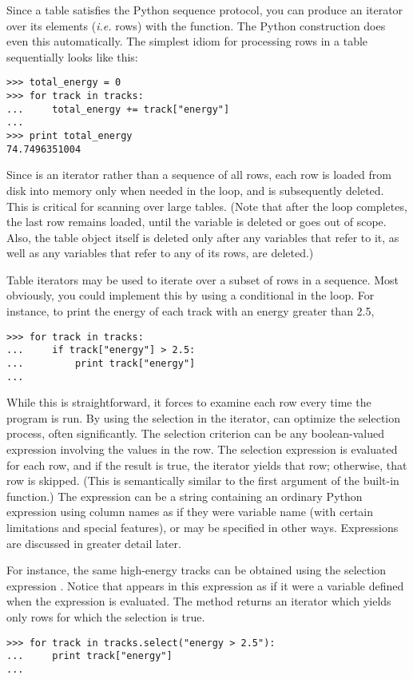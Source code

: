 Since a table satisfies the Python sequence protocol, you can produce an
iterator over its elements (\textit{i.e.} rows) with the 
function.  The Python  construction does even this
automatically.  The simplest idiom for processing rows in a table
sequentially looks like this:
\begin{verbatim}
>>> total_energy = 0
>>> for track in tracks:
...     total_energy += track["energy"]
...
>>> print total_energy
74.7496351004
\end{verbatim}

Since  is an iterator rather than a sequence of all
rows, each row is loaded from disk into memory only when needed in the
loop, and is subsequently deleted.  This is critical for scanning over
large tables.  (Note that after the loop completes, the last row remains
loaded, until the variable  is deleted or goes out of scope.
Also, the table object itself is deleted only after any variables that
refer to it, as well as any variables that refer to any of its rows, are
deleted.)

Table iterators may be used to iterate over a subset of rows in a
sequence.  Most obviously, you could implement this by using a
conditional in the loop.  For instance, to print the energy of each
track with an energy greater than 2.5,
\begin{verbatim}
>>> for track in tracks:
...     if track["energy"] > 2.5:
...         print track["energy"]
... 
\end{verbatim}
While this is straightforward, it forces \pyhep to examine each row
every time the program is run.  By using the selection in the iterator,
\pyhep can optimize the selection process, often significantly.
The selection criterion can be any boolean-valued expression involving
the values in the row.  The selection expression is evaluated for each
row, and if the result is true, the iterator yields that row; otherwise,
that row is skipped.  (This is semantically similar to the first
argument of the built-in  function.)  The expression
can be a string containing an ordinary Python expression using column
names as if they were variable name (with certain limitations and
special features), or may be specified in other ways.  Expressions are
discussed in greater detail later.

For instance, the same high-energy tracks can be obtained using the
selection expression .  Notice that
 appears in this expression as if it were a variable defined
when the expression is evaluated.  The  method returns an
iterator which yields only rows for which the selection is true.
\begin{verbatim}
>>> for track in tracks.select("energy > 2.5"):
...     print track["energy"]
... 
\end{verbatim}

